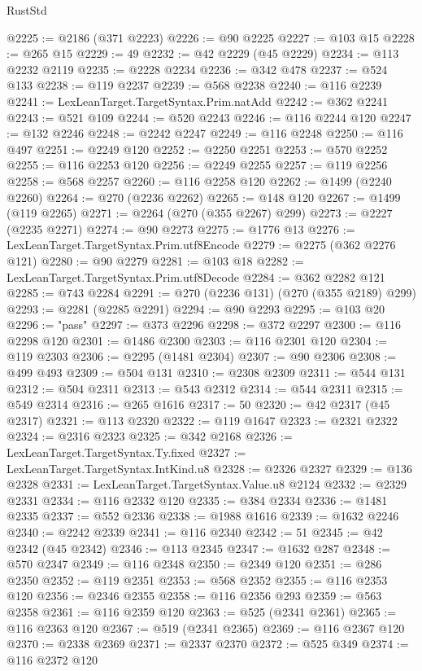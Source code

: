 \begin{lexlean}{RustStd}
\begin{coremodule}
@2225 := @2186 (@371 @2223)
@2226 := @90 @2225
@2227 := @103 @15
@2228 := @265 @15
@2229 := 49
@2232 := @42 @2229 (@45 @2229)
@2234 := @113 @2232 @2119
@2235 := @2228 @2234
@2236 := @342 @478
@2237 := @524 @133
@2238 := @119 @2237
@2239 := @568 @2238
@2240 := @116 @2239
@2241 := LexLeanTarget.TargetSyntax.Prim.natAdd
@2242 := @362 @2241
@2243 := @521 @109
@2244 := @520 @2243
@2246 := @116 @2244 @120
@2247 := @132 @2246
@2248 := @2242 @2247
@2249 := @116 @2248
@2250 := @116 @497
@2251 := @2249 @120
@2252 := @2250 @2251
@2253 := @570 @2252
@2255 := @116 @2253 @120
@2256 := @2249 @2255
@2257 := @119 @2256
@2258 := @568 @2257
@2260 := @116 @2258 @120
@2262 := @1499 (@2240 @2260)
@2264 := @270 (@2236 @2262)
@2265 := @148 @120
@2267 := @1499 (@119 @2265)
@2271 := @2264 (@270 (@355 @2267) @299)
@2273 := @2227 (@2235 @2271)
@2274 := @90 @2273
@2275 := @1776 @13
@2276 := LexLeanTarget.TargetSyntax.Prim.utf8Encode
@2279 := @2275 (@362 @2276 @121)
@2280 := @90 @2279
@2281 := @103 @18
@2282 := LexLeanTarget.TargetSyntax.Prim.utf8Decode
@2284 := @362 @2282 @121
@2285 := @743 @2284
@2291 := @270 (@2236 @131) (@270 (@355 @2189) @299)
@2293 := @2281 (@2285 @2291)
@2294 := @90 @2293
@2295 := @103 @20
@2296 := "pass"
@2297 := @373 @2296
@2298 := @372 @2297
@2300 := @116 @2298 @120
@2301 := @1486 @2300
@2303 := @116 @2301 @120
@2304 := @119 @2303
@2306 := @2295 (@1481 @2304)
@2307 := @90 @2306
@2308 := @499 @493
@2309 := @504 @131
@2310 := @2308 @2309
@2311 := @544 @131
@2312 := @504 @2311
@2313 := @543 @2312
@2314 := @544 @2311
@2315 := @549 @2314
@2316 := @265 @1616
@2317 := 50
@2320 := @42 @2317 (@45 @2317)
@2321 := @113 @2320
@2322 := @119 @1647
@2323 := @2321 @2322
@2324 := @2316 @2323
@2325 := @342 @2168
@2326 := LexLeanTarget.TargetSyntax.Ty.fixed
@2327 := LexLeanTarget.TargetSyntax.IntKind.u8
@2328 := @2326 @2327
@2329 := @136 @2328
@2331 := LexLeanTarget.TargetSyntax.Value.u8 @2124
@2332 := @2329 @2331
@2334 := @116 @2332 @120
@2335 := @384 @2334
@2336 := @1481 @2335
@2337 := @552 @2336
@2338 := @1988 @1616
@2339 := @1632 @2246
@2340 := @2242 @2339
@2341 := @116 @2340
@2342 := 51
@2345 := @42 @2342 (@45 @2342)
@2346 := @113 @2345
@2347 := @1632 @287
@2348 := @570 @2347
@2349 := @116 @2348
@2350 := @2349 @120
@2351 := @286 @2350
@2352 := @119 @2351
@2353 := @568 @2352
@2355 := @116 @2353 @120
@2356 := @2346 @2355
@2358 := @116 @2356 @293
@2359 := @563 @2358
@2361 := @116 @2359 @120
@2363 := @525 (@2341 @2361)
@2365 := @116 @2363 @120
@2367 := @519 (@2341 @2365)
@2369 := @116 @2367 @120
@2370 := @2338 @2369
@2371 := @2337 @2370
@2372 := @525 @349
@2374 := @116 @2372 @120

\end{coremodule}
\end{lexlean}
